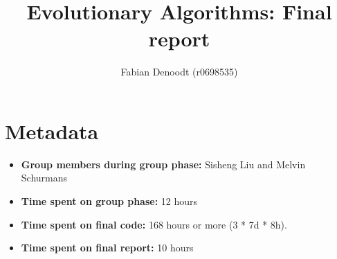 \documentclass[a4paper,10pt]{article}
\title{Evolutionary Algorithms: Final report}
\author{Fabian Denoodt (r0698535)}
\def\retake{0}
\newcommand{\switch}[2]{\ifnum\retake=0{#1}\else{#2}\fi}
\newcommand{\thisyear}{\the\year}
\newcommand{\deadlineCode}{\switch{December 31, \thisyear{} at 18:00 CET}{August 14, \thisyear{} at 18:00 CET}}
\newcommand{\deadlineReport}{\deadlineCode}
\newcommand{\ReplaceMe}[1]{{\color{blue}#1}}
\newcommand{\RemoveMe}[1]{{\color{purple}#1}}
\begin{document}
\selectfont{}

\maketitle

%
%
%
%
%
%

\section{Metadata}

\begin{itemize}
 \item \textbf{Group members during group phase:} Sisheng Liu and Melvin Schurmans
 \item \textbf{Time spent on group phase:} 12 hours
 \item \textbf{Time spent on final code:} 168 hours or more (3 * 7d * 8h).
 \item \textbf{Time spent on final report:} \ReplaceMe{10 hours}
\end{itemize}
\end{document}
